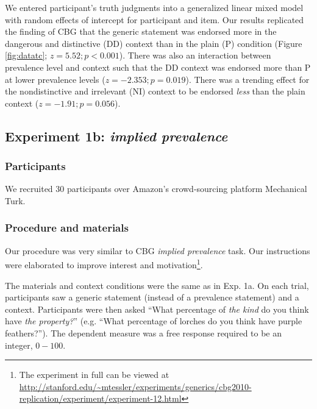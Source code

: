 \documentclass[10pt,letterpaper]{article}
\begin{document}

We entered participant's truth judgments into a generalized linear mixed model with random effects of intercept for participant and item.  Our results replicated the finding of CBG that the generic statement was endorsed more in the dangerous and distinctive (DD) context than in the plain (P) condition (Figure \ref{fig:datatc}; $z = 5.52; p < 0.001$). There was also an interaction between prevalence level and context such that the DD context was endorsed more than P at lower prevalence levels ($z=-2.353; p = 0.019$). There was a trending effect for the nondistinctive and irrelevant (NI) context to be endorsed \emph{less} than the plain context ($z=-1.91; p = 0.056$).

\subsection{Experiment 1b: \emph{implied prevalence}}

\subsubsection{Participants}

We recruited 30 participants over Amazon's crowd-sourcing platform Mechanical Turk.  

\subsubsection{Procedure and materials}

Our procedure was very similar to CBG \emph{implied prevalence} task. Our instructions were elaborated to improve interest and motivation\footnote{The experiment in full can be viewed at \url{http://stanford.edu/~mtessler/experiments/generics/cbg2010-replication/experiment/experiment-12.html}}. 

The materials and context conditions were the same as in Exp. 1a. 
On each trial, participants saw a generic statement (instead of a prevalence statement) and a context. 
Participants were then asked ``What percentage of \emph{the kind} do you think have \emph{the property?}'' (e.g. ``What percentage of lorches do you think have  purple feathers?''). The dependent measure was a free response required to be an integer, $0-100$. 
\end{document}
